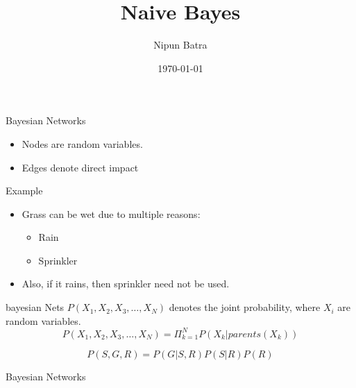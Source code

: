 \documentclass{beamer}
\title{Naive Bayes}
\date{\today}
\author{Nipun Batra}
\institute{IIT Gandhinagar}
\begin{document}
  \maketitle
  
  
  

\begin{frame}{Bayesian Networks}
\begin{itemize}
	
	
	\item Nodes are random variables.
	\item Edges denote direct impact

	
\end{itemize}
\end{frame}

\begin{frame}{Example}
\begin{itemize}

\item Grass can be wet due to multiple reasons:
\begin{itemize}
    \item Rain
    \item Sprinkler
\end{itemize}
\item Also, if it rains, then sprinkler need not be used.
\end{itemize}

    


	

\end{frame}

\begin{frame}{bayesian Nets}
    $P(X_{1},X_{2},X_{3},\dots,X_{N})$ denotes the joint probability, where $X_{i}$ are random variables.
    \begin{equation*}
        P(X_{1},X_{2},X_{3},\dots,X_{N}) = \Pi_{k=1}^{N} P(X_{k} | parents(X_{k}))
    \end{equation*}
    
    
    \begin{equation*}
        P(S,G,R) =  P(G|S,R)P(S|R)P(R)
    \end{equation*}
    
\end{frame}


\begin{frame}{Bayesian Networks}
\end{frame}
\end{document}
